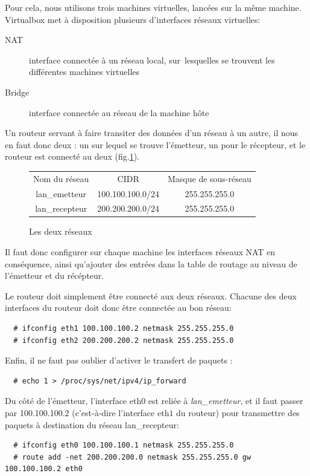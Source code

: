\documentclass[a4paper]{article}
\begin{document}
Pour cela, nous utilisons trois machines virtuelles,
lancées sur la même machine. Virtualbox met à disposition
plusieurs d'interfaces réseaux virtuelles:
\begin{description}
	\item[NAT] interface connectée à un réseau local, sur\
	lesquelles se trouvent les différentes machines virtuelles
	\item[Bridge] interface connectée au réseau de la machine hôte
\end{description}

Un routeur servant à faire transiter des données d'un réseau
à un autre, il nous en faut donc deux : un sur lequel se
trouve l'émetteur, un pour le récepteur, et le routeur est
connecté au deux (fig.\ref{reseaux}).
\begin{figure}
	\centering
	\begin{tabular}{c|c|c}
	Nom du réseau & CIDR & Masque de sous-réseau\\
	lan\_emetteur & 100.100.100.0/24 & 255.255.255.0\\
	lan\_recepteur & 200.200.200.0/24 & 255.255.255.0\\
	\end{tabular}
	\caption{\label{reseaux} Les deux réseaux}
\end{figure}

Il faut donc configurer sur chaque machine les interfaces
réseaux NAT en conséquence, ainsi qu'ajouter des entrées
dans la table de routage au niveau de l'émetteur et
du récépteur.

Le routeur doit simplement être connecté aux deux réseaux.
Chacune des deux interfaces du routeur doit donc être
connectée au bon réseau:
\begin{verbatim}
  # ifconfig eth1 100.100.100.2 netmask 255.255.255.0
  # ifconfig eth2 200.200.200.2 netmask 255.255.255.0
\end{verbatim}

Enfin, il ne faut pas oublier d'activer le transfert de
paquets :
\begin{verbatim}
  # echo 1 > /proc/sys/net/ipv4/ip_forward
\end{verbatim}

Du côté de l'émetteur, l'interface eth$0$ est reliée à
\textit{lan\_emetteur}, et il faut passer par 100.100.100.2
(c'est-à-dire l'interface eth$1$ du routeur) pour transmettre
des paquets à destination du réseau lan\_recepteur:
\begin{verbatim}
  # ifconfig eth0 100.100.100.1 netmask 255.255.255.0
  # route add -net 200.200.200.0 netmask 255.255.255.0 gw 100.100.100.2 eth0
\end{verbatim}
\end{document}
